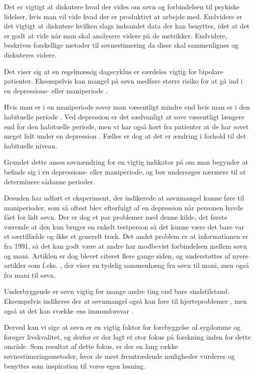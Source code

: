 Det er vigtigt at diskutere hvad der vides om søvn og forbindelsen til psykiske lidelser, hvis man vil vide hvad der er produktivt at arbejde med.
Endvidere er det vigtigt at diskutere hvilken slags indsamlet data der kan benyttes, idet at det er godt at vide når man skal analysere videre på de metrikker.
Endvidere, beskrives forskellige metoder til søvnestimering da disse skal sammenlignes og diskuteres videre.

Det viser sig at en regelmæssig dagscyklus er særdeles vigtig for bipolare patienter.
Eksempelvis kan mangel på søvn medføre større risiko for at gå ind i en depressions- eller maniperiode \citep{CPSP:CPSP1164}.

Hvis man er i en maniperiode sover man væsentligt mindre end hvis man er i den habituelle periode \citep{CPSP:CPSP1164}.
Ved depression er det sædvanligt at sove væsentligt længere end for den habituelle periode, men vi har også hørt fra patienter at de har sovet meget lidt under en depression \citep[Kapitel 2, Sektion 5]{misc:faellesrapp} . Fælles er dog at det er ændring i forhold til det habituelle niveau.

Grundet dette anses søvnændring for en vigtig indikator på om man begynder at befinde sig i en depressions- eller maniperiode, og bør undersøges nærmere til at determinere sådanne perioder.

Desuden har \citet{art:sleepCusMania} udført et eksperiment, der indikerede at søvnmangel kunne føre til maniperioder, som så oftest blev efterfulgt af en depression når personen havde fået for lidt søvn.
Der er dog et par problemer med denne kilde, det første værende at den kun bruger en enkelt testperson så det kunne være det bare var et særtilfælde og ikke et generelt træk.
Det andet problem er at informationen er fra 1991, så det kan godt være at andre har modbevist forbindelsen mellem søvn og mani.
Artiklen er dog blevet citeret flere gange siden, og understøttes af nyere artikler som f.eks. \citet{barbini1996sleep}, der viser en tydelig sammenhæng fra søvn til mani, men også fra mani til søvn.

Underbyggende er søvn vigtig for mange andre ting end bare sindstilstand.
Eksempelvis indikeres der at søvnmangel også kan føre til hjerteproblemer \citep{Mullington2009294,art:sleeplossHeart}, men også at det kan svække ens immunforsvar \citep{misc:sleepImmune}.

Derved kan vi sige at søvn er en vigtig faktor for forebyggelse af sygdomme og forøger livskvalitet, og derfor er der lagt et stor fokus på forskning inden for dette område.
Som resultat af dette fokus, er der en lang række søvnestimeringsmetoder, hvor de mest fremtrædende muligheder vurderes og benyttes som inspiration til vores egen løsning.

